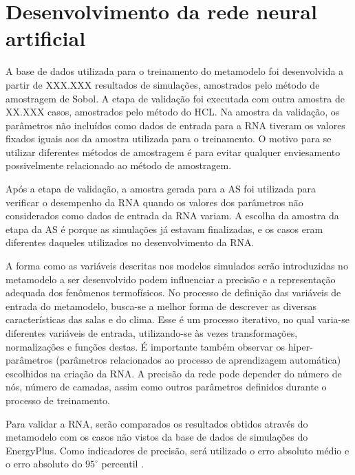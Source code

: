 \documentclass[brazil,hardcopy,openany,a5paper]{ufscthesis}
\begin{document}
		\section{Desenvolvimento da rede neural artificial}
		
		A base de dados utilizada para o treinamento do metamodelo foi desenvolvida a partir de XXX.XXX resultados de simulações, amostrados pelo método de amostragem de Sobol. A etapa de validação foi executada com outra amostra de XX.XXX casos, amostrados pelo método do HCL. Na amostra da validação, os parâmetros não incluídos como dados de entrada para a RNA tiveram os valores fixados iguais aos da amostra utilizada para o treinamento. O motivo para se utilizar diferentes métodos de amostragem é para evitar qualquer enviesamento possivelmente relacionado ao método de amostragem.
		
		Após a etapa de validação, a amostra gerada para a AS foi utilizada para verificar o desempenho da RNA quando os valores dos parâmetros não considerados como dados de entrada da RNA variam. A escolha da amostra da etapa da AS é porque as simulações já estavam finalizadas, e os casos eram diferentes daqueles utilizados no desenvolvimento da RNA. 
		
		A forma como as variáveis descritas nos modelos simulados serão introduzidas no metamodelo a ser desenvolvido podem influenciar a precisão e a representação adequada dos fenômenos termofísicos. No processo de definição das variáveis de entrada do metamodelo, busca-se a melhor forma de descrever as diversas características das salas e do clima. Esse é um processo iterativo, no qual varia-se diferentes variáveis de entrada, utilizando-se às vezes transformações, normalizações e funções destas. É importante também observar os hiper-parâmetros (parâmetros relacionados ao processo de aprendizagem automática) escolhidos na criação da RNA. A precisão da rede pode depender do número de nós, número de camadas, assim como outros parâmetros definidos durante o processo de treinamento.
		
		Para validar a RNA, serão comparados os resultados obtidos através do metamodelo com os casos não vistos da base de dados de simulações do EnergyPlus. Como indicadores de precisão, será utilizado o erro absoluto médio e o erro absoluto do $95^{\circ}$ percentil .
		

%
%

	
\end{document}
